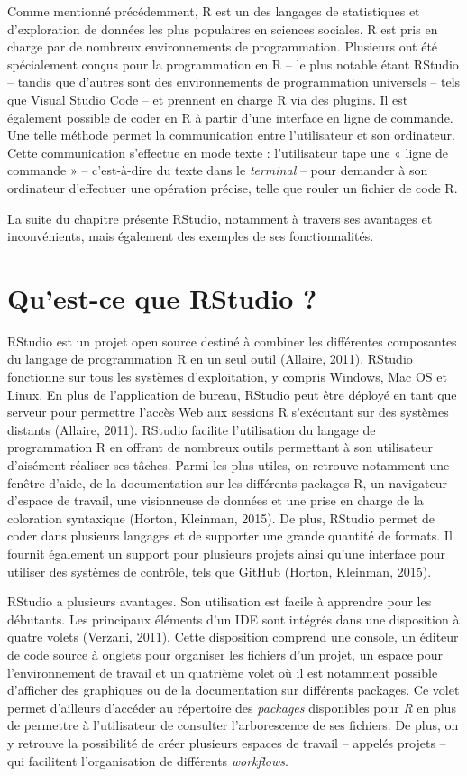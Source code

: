 \documentclass[
  letterpaper,
  DIV=11,
  numbers=noendperiod]{scrreprt}
\begin{document}
Comme mentionné précédemment, R est un des langages de statistiques et
d'exploration de données les plus populaires en sciences sociales. R est
pris en charge par de nombreux environnements de programmation.
Plusieurs ont été spécialement conçus pour la programmation en R -- le
plus notable étant RStudio -- tandis que d'autres sont des
environnements de programmation universels -- tels que Visual Studio
Code -- et prennent en charge R via des plugins. Il est également
possible de coder en R à partir d'une interface en ligne de commande.
Une telle méthode permet la communication entre l'utilisateur et son
ordinateur. Cette communication s'effectue en mode texte : l'utilisateur
tape une « ligne de commande » -- c'est-à-dire du texte dans le
\emph{terminal} -- pour demander à son ordinateur d'effectuer une
opération précise, telle que rouler un fichier de code R.

La suite du chapitre présente RStudio, notamment à travers ses avantages
et inconvénients, mais également des exemples de ses fonctionnalités.

\section{Qu'est-ce que RStudio ?}\label{quest-ce-que-rstudio}

RStudio est un projet open source destiné à combiner les différentes
composantes du langage de programmation R en un seul outil (Allaire,
2011). RStudio fonctionne sur tous les systèmes d'exploitation, y
compris Windows, Mac OS et Linux. En plus de l'application de bureau,
RStudio peut être déployé en tant que serveur pour permettre l'accès Web
aux sessions R s'exécutant sur des systèmes distants (Allaire, 2011).
RStudio facilite l'utilisation du langage de programmation R en offrant
de nombreux outils permettant à son utilisateur d'aisément réaliser ses
tâches. Parmi les plus utiles, on retrouve notamment une fenêtre d'aide,
de la documentation sur les différents packages R, un navigateur
d'espace de travail, une visionneuse de données et une prise en charge
de la coloration syntaxique (Horton, Kleinman, 2015). De plus, RStudio
permet de coder dans plusieurs langages et de supporter une grande
quantité de formats. Il fournit également un support pour plusieurs
projets ainsi qu'une interface pour utiliser des systèmes de contrôle,
tels que GitHub (Horton, Kleinman, 2015).

RStudio a plusieurs avantages. Son utilisation est facile à apprendre
pour les débutants. Les principaux éléments d'un IDE sont intégrés dans
une disposition à quatre volets (Verzani, 2011). Cette disposition
comprend une console, un éditeur de code source à onglets pour organiser
les fichiers d'un projet, un espace pour l'environnement de travail et
un quatrième volet où il est notamment possible d'afficher des
graphiques ou de la documentation sur différents packages. Ce volet
permet d'ailleurs d'accéder au répertoire des \emph{packages}
disponibles pour \emph{R} en plus de permettre à l'utilisateur de
consulter l'arborescence de ses fichiers. De plus, on y retrouve la
possibilité de créer plusieurs espaces de travail -- appelés projets --
qui facilitent l'organisation de différents \emph{workflows}.
\end{document}
